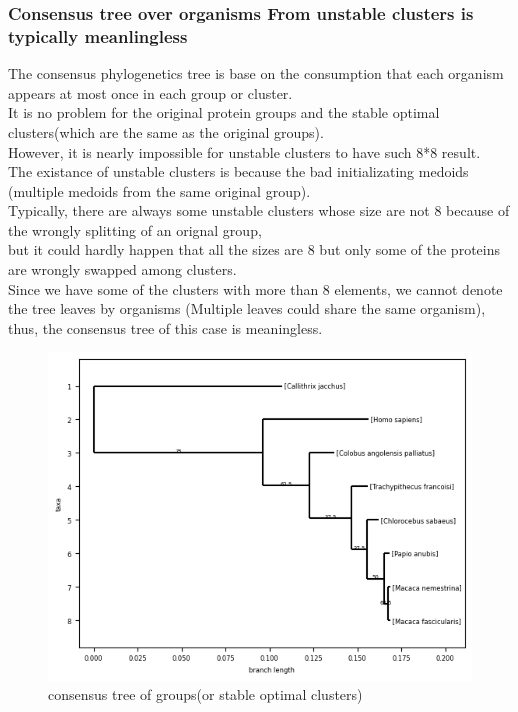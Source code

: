 \documentclass[a4paper, 12pt, one column]{article}
\begin{document}
\subsubsection{Consensus tree over organisms From unstable clusters is typically meanlingless}
The consensus phylogenetics tree is base on the consumption that each organism appears at most once in each group or cluster. \\
It is no problem for the original protein groups and the stable optimal clusters(which are the same as the original groups). \\
However, it is nearly impossible for unstable clusters to have such 8*8 result. \\
The existance of unstable clusters is because the bad initializating medoids (multiple medoids from the same original group).\\
Typically, there are always some unstable clusters whose size are not 8 because of the wrongly splitting of an orignal group, \\
but it could hardly happen that all the sizes are 8 but only some of the proteins are wrongly swapped among clusters. \\
Since we have some of the clusters with more than 8 elements, we cannot denote the tree leaves by organisms (Multiple leaves could share the same organism), \\
thus, the consensus tree of this case is meaningless.

\begin{figure}[H]
    \centering
    \includegraphics[width=.8\linewidth]{concensus_tree_of_groups.png}
    \caption{consensus tree of groups(or stable optimal clusters)}
    \label{fig:concensus_tree_of_groups.png}
\end{figure}  
\end{document}
